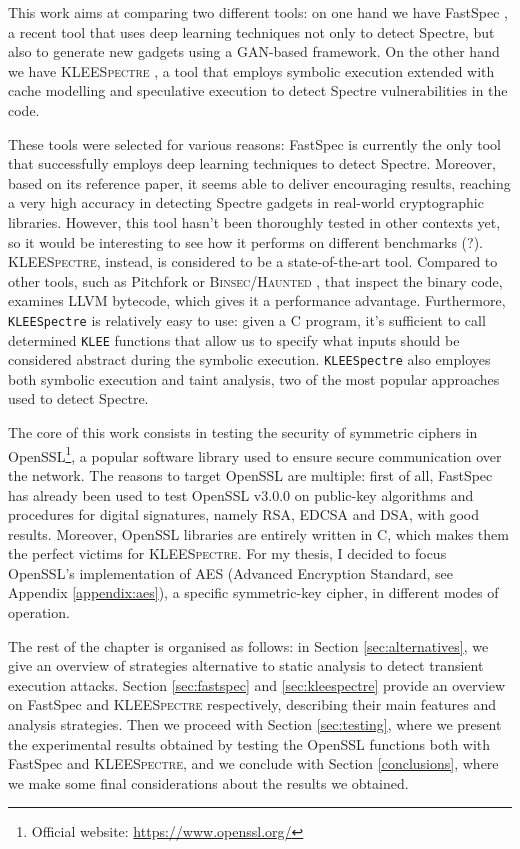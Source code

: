 \documentclass[12pt,a4paper]{book}
\theoremstyle{definition}
\begin{document}
	This work aims at comparing two different tools: on one hand we have FastSpec \cite{Tol2021}, a recent tool that uses deep learning techniques not only to detect Spectre, but also to generate new gadgets using a GAN-based framework. On the other hand we have \textsc{\textsc{KLEE}Spectre} \cite{Wang2020}, a tool that employs symbolic execution extended with cache modelling and speculative execution to detect Spectre vulnerabilities in the code. 
	
	These tools were selected for various reasons: FastSpec is currently the only tool that successfully employs deep learning techniques to detect Spectre. Moreover, based on its reference paper, it seems able to deliver encouraging results, reaching a very high accuracy in detecting Spectre gadgets in real-world cryptographic libraries. However, this tool hasn't been thoroughly tested in other contexts yet, so it would be interesting to see how it performs on different benchmarks (?). \textsc{KLEESpectre}, instead, is considered to be a state-of-the-art tool. Compared to other tools, such as Pitchfork or \textsc{Binsec/Haunted} \cite{Daniel2021}, that inspect the binary code,  examines LLVM bytecode, which gives it a performance advantage. Furthermore, \texttt{KLEESpectre} is relatively easy to use: given a C program, it's sufficient to call determined \texttt{KLEE} functions that allow us to specify what inputs should be considered abstract during the symbolic execution. \texttt{KLEESpectre} also employes both symbolic execution and taint analysis, two of the most popular approaches used to detect Spectre.
	
	The core of this work consists in testing the security of symmetric ciphers in OpenSSL\footnote{Official website: \url{https://www.openssl.org/}}, a popular software library used to ensure secure communication over the network. The reasons to target OpenSSL are multiple: first of all, FastSpec has already been used to test OpenSSL v3.0.0 on public-key algorithms and procedures for digital signatures, namely RSA, EDCSA and DSA, with good results. Moreover, OpenSSL libraries are entirely written in C, which makes them the perfect victims for \textsc{KLEESpectre}. For my thesis, I decided to focus OpenSSL's implementation of AES (Advanced Encryption Standard, see Appendix \ref{appendix:aes}), a specific symmetric-key cipher, in different modes of operation. 
	
	The rest of the chapter is organised as follows: in Section \ref{sec:alternatives}, we give an overview of strategies alternative to static analysis to detect transient execution attacks. Section \ref{sec:fastspec} and \ref{sec:kleespectre} provide an overview on FastSpec and \textsc{KLEESpectre} respectively, describing their main features and analysis strategies. Then we proceed with Section \ref{sec:testing}, where we present the experimental results obtained by testing the OpenSSL functions both with FastSpec and \textsc{KLEESpectre}, and we conclude with Section \ref{conclusions}, where we make some final considerations about the results we obtained. 
	
\end{document}
